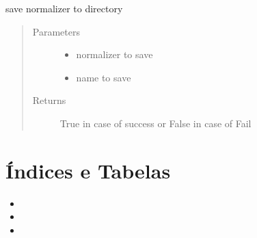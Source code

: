 \documentclass[letterpaper,10pt,english]{sphinxmanual}
\begin{document}

\begin{fulllineitems}
\label{\detokenize{algorithms:repository.repository_service.save_normalizer}}
\sphinxAtStartPar
save normalizer to directory
\begin{quote}\begin{description}
\item[{Parameters}] \leavevmode\begin{itemize}
\item {} 
\sphinxAtStartPar
{} \textendash{} normalizer to save

\item {} 
\sphinxAtStartPar
{} \textendash{} name to save

\end{itemize}

\item[{Returns}] \leavevmode
\sphinxAtStartPar
True in case of success or False in case of Fail

\end{description}\end{quote}

\end{fulllineitems}



\chapter{Índices e Tabelas}
\label{\detokenize{index:indices-e-tabelas}}\begin{itemize}
\item {} 
\sphinxAtStartPar
{}

\item {} 
\sphinxAtStartPar
{}

\item {} 
\sphinxAtStartPar
{}

\end{itemize}
\end{document}
